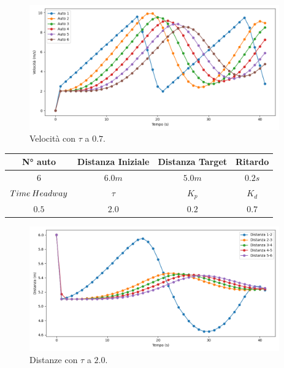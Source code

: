 \begin{figure}[H]
    \includegraphics[width=0.96\textwidth]{images/5-experiment/tau/velocity_0,7.png}
    \caption{Velocità con $\tau$ a $0.7$.}
    \label{fig:0.7-tau-velocity}
\end{figure}
\vspace*{\fill}
\newpage
\vspace*{\fill}
\begin{table}[h]
    \centering
    \begin{tabular}{|c|c|c|c|}
        \hline
        N° auto & Distanza Iniziale & Distanza Target & Ritardo \\
        \hline
        $6$ & $6.0 m$ & $5.0 m$ & $0.2 s$ \\
        \hline
        $Time\hspace{0.2em}Headway$ & $\tau$ & $K_p$ & $K_d$  \\
        \hline
        $0.5$ & $2.0$ & $0.2$ & $0.7$ \\
        \hline
    \end{tabular}
\end{table}

\begin{figure}[H]
    \includegraphics[width=0.96\textwidth]{images/5-experiment/tau/distance_2.png}
    \caption{Distanze con $\tau$ a $2.0$.}
    \label{fig:2-tau-distance}
\end{figure}

